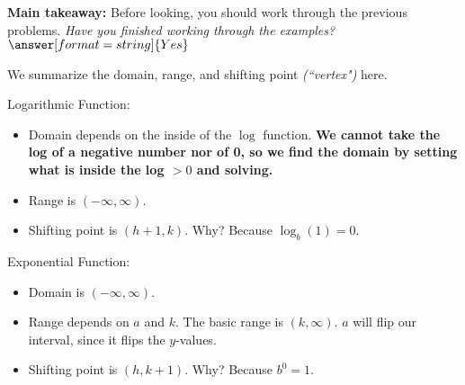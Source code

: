 \documentclass{ximera}
\begin{document}
\begin{question}
\textbf{Main takeaway:} Before looking, you should work through the previous problems. \textit{Have you finished working through the examples?} $\answer[format=string]{Yes}$
\begin{feedback}[correct]
We summarize the domain, range, and shifting point \textit{(``vertex")} here. 

Logarithmic Function: 
\begin{itemize}
    \item Domain depends on the inside of the $\log$ function. \textbf{We cannot take the log of a negative number nor of 0, so we find the domain by setting what is inside the log $> 0$ and solving.} 
	\item Range is $(-\infty, \infty)$. 
	\item Shifting point is $(h+1, k)$. Why? Because $\log_b(1) = 0$. 
\end{itemize}

Exponential Function:
\begin{itemize}
\item Domain is $(-\infty, \infty)$. 
\item Range depends on $a$ and $k$. The basic range is $(k, \infty)$.  $a$ will flip our interval, since it flips the $y$-values.
\item Shifting point is $(h, k+1)$. Why? Because $b^0=1$.
\end{itemize}
\end{feedback}
\end{question}
\end{document}

